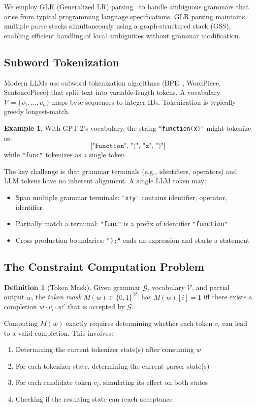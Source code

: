 \documentclass[11pt,a4paper]{article}
\newcommand{\vocab}{\mathcal{V}}
\newcommand{\grammar}{\mathcal{G}}
\theoremstyle{plain}
\theoremstyle{definition}
\newtheorem{definition}[theorem]{Definition}
\newtheorem{example}[theorem]{Example}
\theoremstyle{remark}
\begin{document}
We employ GLR (Generalized LR) parsing~\citep{tomita1985glr} to handle ambiguous grammars that arise from typical programming language specifications. GLR parsing maintains multiple parse stacks simultaneously using a graph-structured stack (GSS), enabling efficient handling of local ambiguities without grammar modification.

\subsection{Subword Tokenization}

Modern LLMs use subword tokenization algorithms (BPE~\citep{sennrich2016bpe}, WordPiece, SentencePiece) that split text into variable-length tokens. A vocabulary $\vocab = \{v_1, \ldots, v_n\}$ maps byte sequences to integer IDs. Tokenization is typically greedy longest-match.

\begin{example}
With GPT-2's vocabulary, the string \texttt{"function(x)"} might tokenize as:
\[\texttt{["function", "(", "x", ")"]}\]
while \texttt{"func"} tokenizes as a single token.
\end{example}

The key challenge is that grammar terminals (e.g., identifiers, operators) and LLM tokens have no inherent alignment. A single LLM token may:
\begin{itemize}
\item Span multiple grammar terminals: \texttt{"x+y"} contains identifier, operator, identifier
\item Partially match a terminal: \texttt{"func"} is a prefix of identifier \texttt{"function"}  
\item Cross production boundaries: \texttt{");"} ends an expression and starts a statement
\end{itemize}

\subsection{The Constraint Computation Problem}

\begin{definition}[Token Mask]
Given grammar $\grammar$, vocabulary $\vocab$, and partial output $w$, the \emph{token mask} $M(w) \in \{0,1\}^{|\vocab|}$ has $M(w)[i] = 1$ iff there exists a completion $w \cdot v_i \cdot w'$ that is accepted by $\grammar$.
\end{definition}

Computing $M(w)$ exactly requires determining whether each token $v_i$ can lead to a valid completion. This involves:
\begin{enumerate}
\item Determining the current tokenizer state(s) after consuming $w$
\item For each tokenizer state, determining the current parser state(s)
\item For each candidate token $v_i$, simulating its effect on both states
\item Checking if the resulting state can reach acceptance
\end{enumerate}
\end{document}

